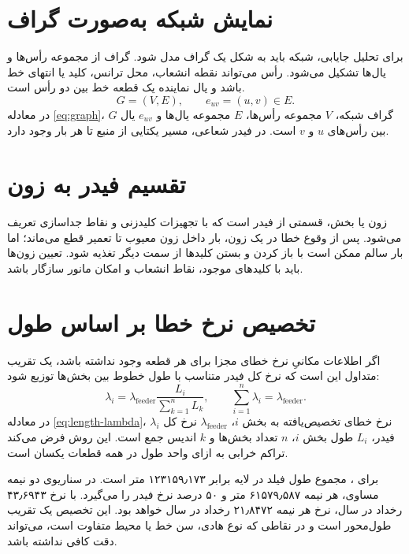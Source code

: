 \documentclass[11pt,a4paper,oneside]{book}
\newcommand{\code}[1]{\lr{\texttt{#1}}}
\begin{document}
\section{نمایش شبکه به‌صورت گراف}
برای تحلیل جایابی، شبکه باید به شکل یک گراف مدل شود. گراف از مجموعه رأس‌ها و یال‌ها تشکیل می‌شود. رأس می‌تواند نقطه انشعاب، محل ترانس، کلید یا انتهای خط باشد و یال نماینده یک قطعه خط بین دو رأس است.
\begin{equation}
 G=(V,E),
 \qquad
 e_{uv}=(u,v)\in E.
 \label{eq:graph}
\end{equation}
در معادله \eqref{eq:graph}، $G$ گراف شبکه، $V$ مجموعه رأس‌ها، $E$ مجموعه یال‌ها و $e_{uv}$ یال بین رأس‌های $u$ و $v$ است. در فیدر شعاعی، مسیر یکتایی از منبع تا هر بار وجود دارد.

\section{تقسیم فیدر به زون}
زون یا بخش، قسمتی از فیدر است که با تجهیزات کلیدزنی و نقاط جداسازی تعریف می‌شود. پس از وقوع خطا در یک زون، بار داخل زون معیوب تا تعمیر قطع می‌ماند؛ اما بار سالم ممکن است با باز کردن و بستن کلیدها از سمت دیگر تغذیه شود. تعیین زون‌ها باید با کلیدهای موجود، نقاط انشعاب و امکان مانور سازگار باشد.

\section{تخصیص نرخ خطا بر اساس طول}
اگر اطلاعات مکانیِ نرخ خطای مجزا برای هر قطعه وجود نداشته باشد، یک تقریب متداول این است که نرخ کل فیدر متناسب با طول خطوط بین بخش‌ها توزیع شود:
\begin{equation}
 \lambda_i=\lambda_{\mathrm{feeder}}\frac{L_i}{\sum_{k=1}^{n}L_k},
 \qquad
 \sum_{i=1}^{n}\lambda_i=\lambda_{\mathrm{feeder}}.
 \label{eq:length-lambda}
\end{equation}
در معادله \eqref{eq:length-lambda}، $\lambda_i$ نرخ خطای تخصیص‌یافته به بخش $i$، $\lambda_{\mathrm{feeder}}$ نرخ کل فیدر، $L_i$ طول بخش $i$، $n$ تعداد بخش‌ها و $k$ اندیس جمع است. این روش فرض می‌کند تراکم خرابی به ازای واحد طول در همه قطعات یکسان است.

برای \code{F5}، مجموع طول فیلد \code{Shape\_STLe} در لایه \code{ELWOML} برابر ۱۲۳۱۵۹٫۱۷۳ متر است. در سناریوی دو نیمه مساوی، هر نیمه ۶۱۵۷۹٫۵۸۷ متر و ۵۰ درصد نرخ فیدر را می‌گیرد. با نرخ ۴۳٫۶۹۴۳ رخداد در سال، نرخ هر نیمه ۲۱٫۸۴۷۲ رخداد در سال خواهد بود. این تخصیص یک تقریب طول‌محور است و در نقاطی که نوع هادی، سن خط یا محیط متفاوت است، می‌تواند دقت کافی نداشته باشد.
\end{document}
